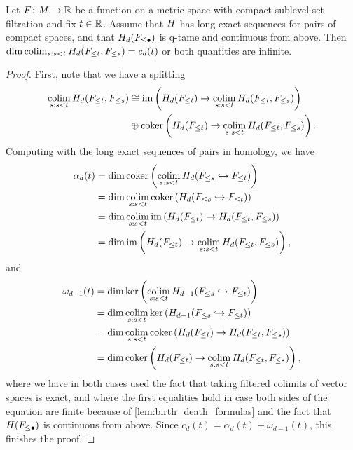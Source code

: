 \begin{prop}\label{prop:cap_limits}
	Let $F \colon M \to \mathbb{R}$ be a function on a metric space with compact sublevel set filtration and fix $t \in \mathbb{R}$.
	Assume that $H$ has long exact sequences for pairs of compact spaces, and that $H_d(F_{\leq \bullet})$ is q-tame and continuous from above.
	Then $\dim \operatorname*{colim}_{s: s < t} H_d(F_{\leq t}, F_{\leq s}) = c_d(t)$ or both quantities are infinite.
\end{prop}
\begin{proof}
	First, note that we have a splitting
	\begin{align*}
	\operatorname*{colim}_{s: s < t} H_d(F_{\leq t}, F_{\leq s})
	&\cong \operatorname{im} \left( H_d(F_{\leq t}) \to \operatorname*{colim}_{s: s < t} H_d(F_{\leq t}, F_{\leq s}) \right) \\
	&\oplus \operatorname{coker} \left( H_d(F_{\leq t}) \to \operatorname*{colim}_{s: s < t} H_d(F_{\leq t}, F_{\leq s}) \right).
	\end{align*}
	Computing with the long exact sequences of pairs in homology, we have
	\begin{align*}
		\alpha_d(t)
		&= \dim \operatorname{coker} \left( \operatorname*{colim}_{s: s < t} H_d(F_{\leq s} \hookrightarrow F_{\leq t}) \right) \\
		&= \dim \operatorname*{colim}_{s: s < t} \operatorname{coker} \left( H_d(F_{\leq s} \hookrightarrow F_{\leq t}) \right) \\
		&= \dim \operatorname*{colim}_{s: s < t} \operatorname{im} \left( H_d(F_{\leq t}) \to H_d(F_{\leq t}, F_{\leq s}) \right) \\
		&= \dim \operatorname{im} \left( H_d(F_{\leq t}) \to \operatorname*{colim}_{s: s < t} H_d(F_{\leq t}, F_{\leq s}) \right), \\
	\end{align*}
	and
	\begin{align*}
		\omega_{d-1}(t)
		&= \dim \ker \left( \operatorname*{colim}_{s: s < t} H_{d-1}(F_{\leq s} \hookrightarrow F_{\leq t}) \right) \\
		&= \dim \operatorname*{colim}_{s: s < t} \ker \left( H_{d-1}(F_{\leq s} \hookrightarrow F_{\leq t}) \right) \\
		&= \dim \operatorname*{colim}_{s: s < t} \operatorname{coker} \left( H_d(F_{\leq t}) \to H_d(F_{\leq t}, F_{\leq s}) \right) \\
		&= \dim \operatorname{coker} \left( H_d(F_{\leq t}) \to \operatorname*{colim}_{s: s < t} H_d(F_{\leq t}, F_{\leq s}) \right), \\
	\end{align*}
	where we have in both cases used the fact that taking filtered colimits of vector spaces is exact, and where the first equalities hold in case both sides of the equation are finite because of \cref{lem:birth_death_formulas} and the fact that $H(F_{\leq \bullet})$ is continuous from above.
	Since $c_d(t) = \alpha_d(t) + \omega_{d-1}(t)$, this finishes the proof.
\end{proof}

